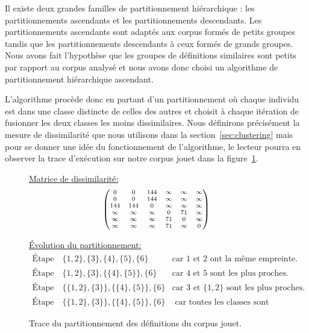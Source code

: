Il existe deux grandes familles de partitionnement hiérarchique : les
partitionnements ascendants et les partitionnements descendants. Les
partitionnements ascendants sont adaptés aux corpus formés de petits
groupes tandis que les partitionnements descendants à ceux formés de
grands groupes. Nous avons fait l'hypothèse que les groupes de
définitions similaires sont petits par rapport au corpus analysé et
nous avons donc choisi un algorithme de partitionnement hiérarchique
ascendant.

L'algorithme procède donc en partant d'un partitionnement où chaque
individu est dans une classe distincte de celles des autres et choisit
à chaque itération de fusionner les deux classes les moins
dissimilaires. Nous définirons précisément la mesure de dissimilarité
que nous utilisons dans la section~\ref{sec:clustering} mais pour
se donner une idée du fonctionnement de l'algorithme, le lecteur
pourra en observer la trace d'exécution sur notre corpus jouet
dans la figure~\ref{fig:clustering-jouet}.

\begin{figure}
\underline{Matrice de dissimilarité:}
\[\scriptsize
\begin{pmatrix}
0 & 0 & 144 & \infty & \infty & \infty \\
0 & 0 & 144 & \infty & \infty & \infty \\
144 & 144 & 0 & \infty & \infty & \infty \\
\infty & \infty & \infty & 0 & 71 & \infty \\
\infty & \infty & \infty & 71 & 0 & \infty \\
\infty & \infty & \infty & 71 & \infty & 0 \\
\end{pmatrix}
\]

\underline{Évolution du partitionnement:}
\[
\begin{array}{rclr}
\text{Étape 1} & \{ 1, 2 \}, \{ 3 \}, \{ 4 \}, \{ 5 \}, \{ 6 \}
& \text{car }1 \text{ et } 2 \text{ ont la même empreinte.} \\
\text{Étape 2} & \{ 1, 2 \}, \{ 3 \}, \{ \{ 4 \}, \{ 5 \} \}, \{ 6 \}
& \text{car }4 \text{ et } 5 \text{ sont les plus proches.} \\
\text{Étape 3} & \{ \{ 1, 2 \}, \{ 3 \} \}, \{ \{ 4 \}, \{ 5 \} \}, \{ 6 \}
& \text{car }3 \text{ et } \{ 1, 2 \} \text{ sont les plus proches.} \\
\text{Étape 4} & \{ \{ 1, 2 \}, \{ 3 \} \}, \{ \{ 4 \}, \{ 5 \} \}, \{ 6 \}
& \text{ car toutes les classes sont absolument dissimilaires.}
\end{array}
\]

\caption{Trace du partitionnement des définitions du corpus jouet.}
\label{fig:clustering-jouet}
\end{figure}

